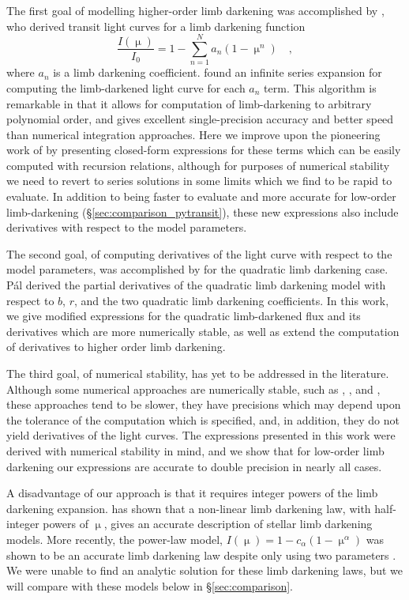 \documentclass[modern,trackchanges]{aastex63}
\newcommand{\edited}{}
\begin{document}
The first goal of modelling higher-order limb darkening was accomplished
by \citet{Gimenez2006}, who derived transit light curves for a limb darkening
function
%
\begin{equation} \label{eq:gimenez}
    \frac{I(\upmu)}{I_0} = 1-\sum_{n=1}^N a_n (1-\upmu^n) \quad,
\end{equation}
%
where $a_n$ is a limb darkening coefficient.  \cite{Gimenez2006}
found an infinite series expansion for computing the limb-darkened light curve
for each $a_n$ term.  {\edited This algorithm is remarkable in that it allows
for computation of limb-darkening to arbitrary polynomial order, and gives
excellent single-precision accuracy and better speed than numerical integration
approaches.}  Here we {\edited improve upon the pioneering work of \citet{Gimenez2006}
by presenting} closed-form expressions for these terms
which can be easily computed with recursion relations, although for purposes
of numerical stability we need to revert to series solutions in some limits
which we find to be rapid to evaluate.  {\edited In addition to being faster
to evaluate and more accurate for low-order limb-darkening 
(\S \ref{sec:comparison_pytransit}), these new expressions
also include derivatives with respect to the model parameters.}

The second goal, of computing derivatives of the light curve with respect to
the model parameters, was accomplished by \cite{Pal2008} for the quadratic
limb darkening case.  P\'al derived the partial derivatives of the quadratic
limb darkening model with respect to $b$, $r$, and the two quadratic
limb darkening coefficients. In this work, we give modified expressions
for the quadratic limb-darkened flux and its derivatives which are
more numerically stable, as well as extend the computation of derivatives
to higher order limb darkening.

The third goal, of numerical stability, has yet to be addressed in the literature.
Although some numerical approaches are numerically stable, such as \cite{Gimenez2006},
\cite{Kreidberg2015}, and \cite{Parviainen2015}, these approaches tend to be
slower, they have precisions which may depend upon the tolerance of the computation
which is specified, and, in addition, they do not yield derivatives of the light curves.
The expressions presented in this work were derived with numerical stability in
mind, and we show that for low-order limb darkening our expressions are accurate
to {\edited double} precision in nearly all cases.

A disadvantage of our approach is that it requires integer powers of the limb darkening
expansion.  \citet{Claret2000} has shown that a non-linear limb darkening law,
with half-integer powers of $\upmu$, gives an accurate description of stellar
limb darkening models.  More recently, the power-law model, $I(\upmu) = 1-
c_\alpha(1-\upmu^\alpha)$ \citep{Hestroffer1997} was shown to be an accurate
limb darkening law despite only using two parameters \citep{Morello2017,Maxted2018}.
We were unable to find an analytic solution for these limb darkening
laws, but we will compare with these models below in \S \ref{sec:comparison}.
\end{document}
